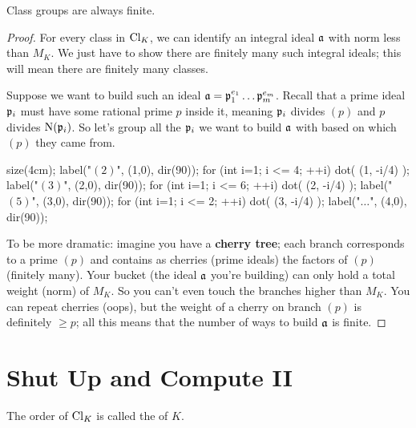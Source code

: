 \begin{corollary}
	Class groups are always finite.
\end{corollary}
\begin{proof}
	For every class in $\Cl_K$,
	we can identify an integral ideal $\aa$ with norm less than $M_K$.
	We just have to show there are finitely many such integral ideals;
	this will mean there are finitely many classes.

	Suppose we want to build such an ideal $\aa = \pp_1^{e_1} \dots \pp_m^{e_m}$.
	Recall that a prime ideal $\pp_i$ must have some rational prime $p$ inside it,
	meaning $\pp_i$ divides $(p)$ and $p$ divides $\Norm(\pp_i)$.
	So let's group all the $\pp_i$ we want to build $\aa$ with based on which $(p)$ they came from.
	\begin{center}
		\begin{asy}
			size(4cm);
			label("$(2)$", (1,0), dir(90));
			for (int i=1; i <= 4; ++i) dot( (1, -i/4) );
			label("$(3)$", (2,0), dir(90));
			for (int i=1; i <= 6; ++i) dot( (2, -i/4) );
			label("$(5)$", (3,0), dir(90));
			for (int i=1; i <= 2; ++i) dot( (3, -i/4) );
			label("$\dots$", (4,0), dir(90));
		\end{asy}
	\end{center}
	To be more dramatic: imagine you have a \textbf{cherry tree}; each branch corresponds to a prime $(p)$
	and contains as cherries (prime ideals) the factors of $(p)$ (finitely many).
	Your bucket (the ideal $\aa$ you're building) can only hold a total weight (norm) of $M_K$.
	So you can't even touch the branches higher than $M_K$.
	You can repeat cherries (oops), but the weight of a cherry on branch $(p)$ is definitely $\ge p$;
	all this means that the number of ways to build $\aa$ is finite.
\end{proof}

\section{Shut Up and Compute II}
\begin{definition}
The order of $\Cl_K$ is called the  of $K$.
\end{definition}

